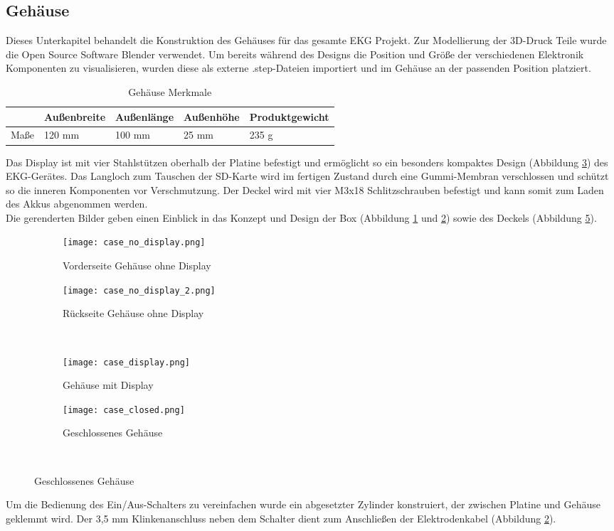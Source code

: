 \subsection{Gehäuse}
Dieses Unterkapitel behandelt die Konstruktion des Gehäuses für das gesamte EKG Projekt. Zur Modellierung der 3D-Druck Teile wurde die Open Source Software Blender \cite{Blender} verwendet. Um bereits während des Designs die Position und Größe der verschiedenen Elektronik Komponenten zu visualisieren, wurden diese als externe .step-Dateien importiert und im Gehäuse an der passenden Position platziert.

\begin{table}[h]
\centering
\caption{Gehäuse Merkmale}
\begin{tabular}[h]{l|l|l|l|l}
		& Außenbreite & Außenlänge & Außenhöhe & Produktgewicht \\
\hline
Maße 	& 120 mm & 100 mm & 25 mm & 235 g \\
\end{tabular}
\end{table}

Das Display ist mit vier Stahlstützen oberhalb der Platine befestigt und ermöglicht so ein besonders kompaktes Design (Abbildung \ref{case_display}) des EKG-Gerätes. Das Langloch zum Tauschen der SD-Karte wird im fertigen Zustand durch eine Gummi-Membran verschlossen und schützt so die inneren Komponenten vor Verschmutzung. Der Deckel wird mit vier M3x18 Schlitzschrauben befestigt und kann somit zum Laden des Akkus abgenommen werden. \\
Die gerenderten Bilder geben einen Einblick in das Konzept und Design der Box (Abbildung \ref{case_no_display1} und \ref{case_no_display2}) sowie des Deckels (Abbildung \ref{case_closed}).

\begin{figure}
	\begin{subfigure}[t]{0.49\textwidth}
		\texttt{[image: case\_no\_display.png]}
		\caption{Vorderseite Gehäuse ohne Display}
		\label{case_no_display1}
	\end{subfigure}\hfill%
	\begin{subfigure}[t]{0.49\textwidth}
		\texttt{[image: case\_no\_display\_2.png]}
		\caption{Rückseite Gehäuse ohne Display}
		\label{case_no_display2}
	\end{subfigure}\\[5pt]%
	
	\begin{subfigure}[t]{0.49\textwidth}
		\texttt{[image: case\_display.png]}
		\caption{Gehäuse mit Display}
		\label{case_display}
	\end{subfigure}\hfill%
	\begin{subfigure}[t]{0.49\textwidth}
		\texttt{[image: case\_closed.png]}
		\caption{Geschlossenes Gehäuse}
		\label{case_closed} 
	\end{subfigure}\\[5pt]%

\end{figure}

Um die Bedienung des Ein/Aus-Schalters zu vereinfachen wurde ein abgesetzter Zylinder konstruiert, der zwischen Platine und Gehäuse geklemmt wird. Der 3,5 mm Klinkenanschluss neben dem Schalter dient zum Anschließen der Elektrodenkabel (Abbildung \ref{case_no_display2}).